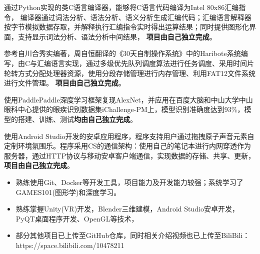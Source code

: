 \vspace{8pt}
通过Python实现的类C语言编译器，能够将C语言代码编译为Intel 80x86汇编指令， 编译器通过词法分析、语法分析、语义分析生成汇编代码；汇编语言解释器按字节模拟数据存取，并解释执行汇编指令实时得出运算结果；同时提供图形化界面，支持显示词法分析、语法分析中间结果， \textbf{项目由自己独立完成}。

\vspace{8pt}
参考自川合秀实编著，周自恒翻译的《30天自制操作系统》中的Haribote系统编写，由C与汇编语言实现，通过多级优先队列调度算法进行任务调度、采用时间片轮转方式分配处理器资源，使用分段存储管理进行内存管理、利用FAT12文件系统进行文件管理。 \textbf{项目由自己独立完成}。


\vspace{8pt}
使用PaddlePaddle深度学习框架复现AlexNet，并应用在百度大脑和中山大学中山眼科中心提供的眼疾识别数据集iChallenge-PM上，模型识别准确度达到93\%，模型的搭建、训练、测试\textbf{均由自己独立完成}。

\vspace{8pt}
使用Android Studio开发的安卓应用程序，程序支持用户通过拖拽原子声音元素自定制环境氛围乐。程序采用CS的通信架构：使用自己的笔记本进行内网穿透作为服务器，通过HTTP协议与移动安卓客户端通信，实现数据的存储、共享、更新，\textbf{项目由自己独立完成}。





\begin{itemize}[parsep=0.5ex]
  \item 熟练使用Git、Docker等开发工具，项目能力及开发能力较强；系统学习了GAMES101(图形学)和深度学习。
  \item 熟练掌握Unity(VR)开发，Blender三维建模，Android Studio安卓开发，PyQT桌面程序开发、OpenGL等技术，
  \item 部分其他项目已上传至GitHub仓库，同时相关介绍视频也已上传至BiliBili：https://space.bilibili.com/10478211
\end{itemize}


